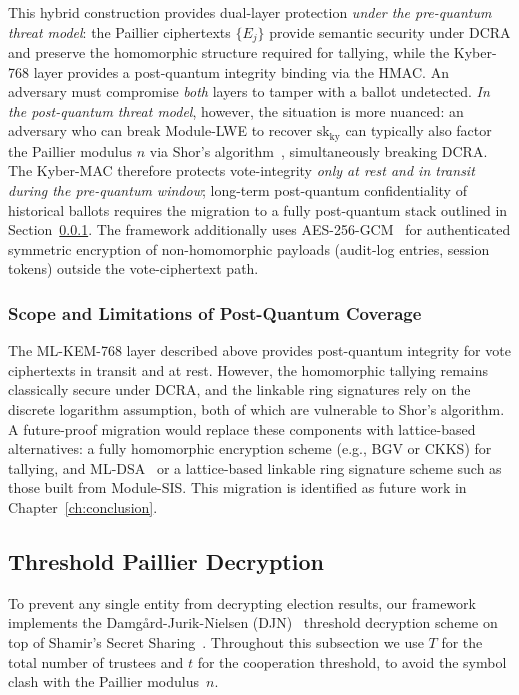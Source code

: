 This hybrid construction provides dual-layer protection \emph{under the pre-quantum threat model}: the Paillier ciphertexts $\{E_j\}$ provide semantic security under DCRA and preserve the homomorphic structure required for tallying, while the Kyber-768 layer provides a post-quantum integrity binding via the HMAC. An adversary must compromise \emph{both} layers to tamper with a ballot undetected. \emph{In the post-quantum threat model}, however, the situation is more nuanced: an adversary who can break Module-LWE to recover $\text{sk}_{\text{ky}}$ can typically also factor the Paillier modulus $n$ via Shor's algorithm~\cite{shor1997}, simultaneously breaking DCRA. The Kyber-MAC therefore protects vote-integrity \emph{only at rest and in transit during the pre-quantum window}; long-term post-quantum confidentiality of historical ballots requires the migration to a fully post-quantum stack outlined in Section~\ref{subsubsec:pq-scope}. The framework additionally uses AES-256-GCM~\cite{nist_gcm} for authenticated symmetric encryption of non-homomorphic payloads (audit-log entries, session tokens) outside the vote-ciphertext path.

\subsubsection{Scope and Limitations of Post-Quantum Coverage}
\label{subsubsec:pq-scope}

The ML-KEM-768 layer described above provides post-quantum integrity for vote ciphertexts in transit and at rest. However, the homomorphic tallying remains classically secure under DCRA, and the linkable ring signatures rely on the discrete logarithm assumption, both of which are vulnerable to Shor's algorithm. A future-proof migration would replace these components with lattice-based alternatives: a fully homomorphic encryption scheme (e.g., BGV or CKKS) for tallying, and ML-DSA~\cite{nist_mldsa} or a lattice-based linkable ring signature scheme such as those built from Module-SIS. This migration is identified as future work in Chapter~\ref{ch:conclusion}.

\subsection{Threshold Paillier Decryption}
\label{subsec:threshold}

To prevent any single entity from decrypting election results, our framework implements the Damg\aa rd-Jurik-Nielsen (DJN)~\cite{damgard2010} threshold decryption scheme on top of Shamir's Secret Sharing~\cite{shamir1979}. Throughout this subsection we use $T$ for the total number of trustees and $t$ for the cooperation threshold, to avoid the symbol clash with the Paillier modulus~$n$.

